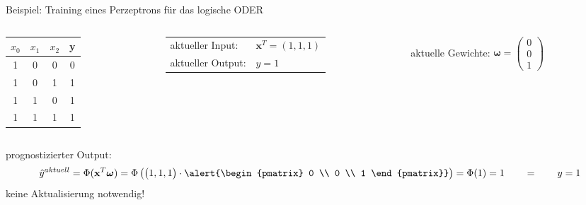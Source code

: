 \documentclass[11pt, aspectratio=169, t]{beamer}
\begin{document}
\begin{frame}{Beispiel: Training eines Perzeptrons für das logische ODER}
\begin{small}
\begin{columns}
\begin{column}{0.25\textwidth}
\hspace{0.5cm}
\begin{footnotesize}
\begin{tabular}{cccc} \toprule
$x_0$ & $x_1$ & $x_2$ & y \\ \midrule
1 & 0 & 0 & 0 \\
1 & 0 & 1 & 1 \\
1 & 1 & 0 & 1 \\
1 & 1 & 1 & 1 \\ \bottomrule
\end{tabular} \end{footnotesize}
\end{column}
\begin{column}{0.4\textwidth}
\begin{tabular}{ll}
aktueller Input: & $\mathbf{x}^{T} = (1, 1, 1)$ \\
aktueller Output: & $y=1$ \\
\end{tabular}
\end{column}
\begin{column}{0.4\textwidth}
aktuelle Gewichte: \alert{ $\boldsymbol{\omega} = \begin{pmatrix} 0 \\ 0 \\ 1 \end{pmatrix}$ }
\end{column}
\end{columns}
prognostizierter Output:
\[\hat{y}^{aktuell} = \Phi(\mathbf{x}^{T}\boldsymbol{\omega}) = \Phi\left( \begin{pmatrix} 1, 1, 1 \end{pmatrix}\cdot \alert{\begin{pmatrix} 0 \\ 0 \\ 1 \end{pmatrix}} \right) = \Phi(1) = 1 \qquad = \qquad y = 1\]
keine Aktualisierung notwendig!
\begin{align*} %
\phantom{\omega_0^{\text{neu}}} & \\
\phantom{\omega_1^{\text{neu}}} & \\
\phantom{\omega_2^{\text{neu}}} &
\end{align*}
\end{small}
\end{frame}
\end{document}
